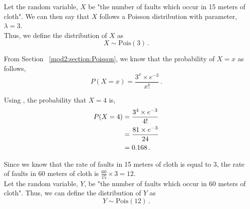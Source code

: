 %
%

\begin{subquestions}
\subquestion

\begin{subsubquestions}
	
\subsubquestion

Let the random variable, $X$ be "the number of faults which occur in 15 meters of cloth". We can then say that $X$ follows a Poisson distribution with parameter, $\lambda = 3$. \\
Thus, we define the distribution of $X$ as
\begin{equation}
	X \sim \text{Pois}(3) \,.
\end{equation}
	
From Section ~\ref{mod2:section:Poisson}, we know that the probability of $X=x$ as follows,
\begin{equation}
	P(X=x) = \frac{3^{x} \times e^{-3}}{x!} \,. \label{2014:q4:PoisEqn}
\end{equation}
	
Using , the probability that $X=4$ is,
\begin{align}
	P(X=4) & = \frac{3^{4} \times e^{-3}}{4!} \nonumber \\
	       & = \frac{81 \times e^{-3}}{24} \nonumber \\
	       & = 0.168 \,.
\end{align} 


\subsubquestion

Since we know that the rate of faults in 15 meters of cloth is equal to 3, the rate of faults in 60 meters of cloth is $\frac{60}{15} \times 3 = 12$. \\
Let the random variable, $Y$, be "the number of faults which occur in 60 meters of cloth". Thus, we can define the distribution of $Y$ as
\begin{equation}
	Y \sim \text{Pois}(12) \,.
\end{equation}


\end{subsubquestions}
\end{subquestions}
